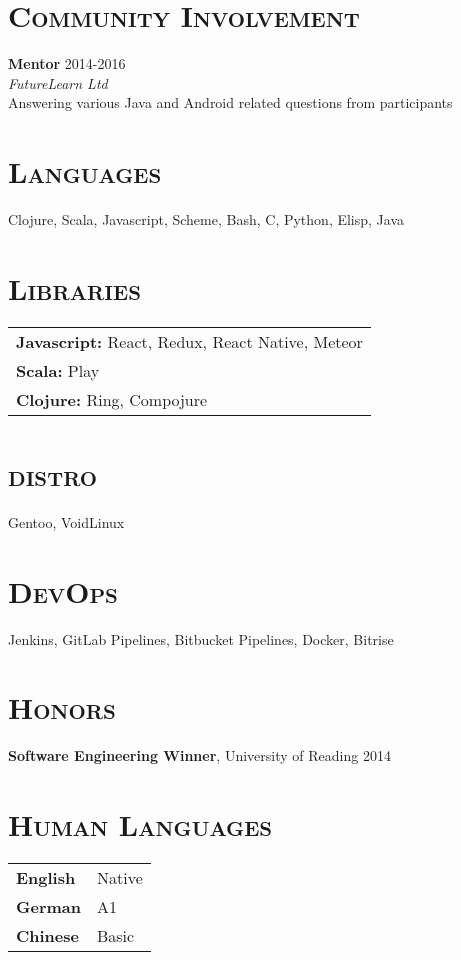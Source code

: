 \documentclass[line, margin, 10pt]{res}
\begin{document}
\begin{resume}
\section{\textsc{Community Involvement}}

{\bf Mentor}  {\hfill 2014-2016}\\
{\it FutureLearn Ltd}\\
Answering various Java and Android related questions from participants

\section{\textsc{Languages}}
Clojure, Scala, Javascript, Scheme, Bash, C, Python, Elisp, Java

\section{\textsc{Libraries}}
\begin{tabular}[t]{@{} p{6.0 in}  @{}}
  {\bf Javascript:} React, Redux, React Native, Meteor \\
  {\bf Scala:} Play \\ 
  {\bf Clojure:} Ring, Compojure \\
\end{tabular}


\section{\textsc {distro}}
Gentoo, VoidLinux \\

\section{\textsc {DevOps}}
Jenkins, GitLab Pipelines, Bitbucket Pipelines, Docker, Bitrise \\

\section{\textsc{Honors}}

{\bf Software Engineering Winner}, University of Reading {\hfill 2014}\\

\section{\textsc{Human Languages}}

\begin{tabular}[t]{@{} p{1.2in} p{3.75in} @{}}

\textbf{English} & Native\\ 
\textbf{German} & A1 \\
\textbf{Chinese} & Basic

\end{tabular}

\end{resume}
\end{document}

